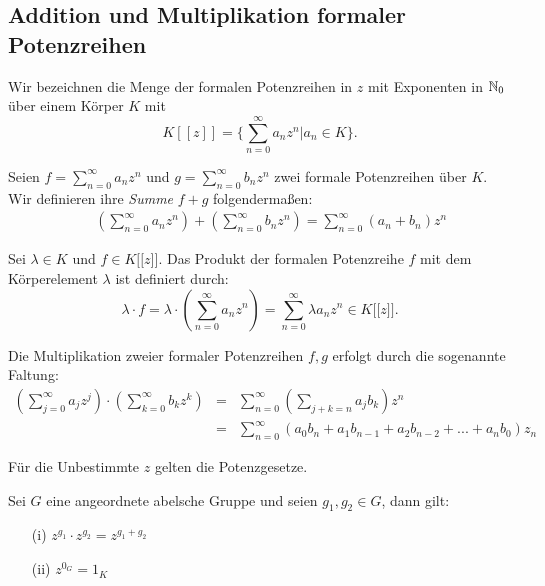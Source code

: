 \subsection{Addition und Multiplikation formaler Potenzreihen} \label{Rechnen}
Wir bezeichnen die Menge der formalen Potenzreihen in $z$ mit Exponenten in $\mathbb{N}_0$ über einem Körper $K$ mit \[K [[z]] = \lbrace \sum_{n=0}^\infty a_n z^n \vert a_n\in K \rbrace. \]
%
%
%
%
\begin{defn}\label{AdditionPotenzreihen}
%
Seien $f = \sum_{n=0}^\infty a_n z^n$ und $g = \sum_{n=0}^\infty b_n z^n$ zwei formale Potenzreihen über $K$. Wir definieren ihre \textit{Summe} $f+g$ folgendermaßen:
\begin{eqnarray*}
&&\left( \sum_{n=0}^\infty a_n z^n \right) + \left( \sum_{n=0}^\infty b_n z^n \right) = \sum_{n=0}^{\infty} (a_n + b_n) z^n 
\end{eqnarray*}
\end{defn}
%
%
% 
\begin{defn}\label{MultiplikationKPotenzreihen}
Sei $\lambda \in K$ und $f \in K\lbrack\lbrack z \rbrack\rbrack$. Das Produkt der formalen Potenzreihe $f$ mit dem Körperelement $\lambda$ ist definiert durch:
\[\lambda\cdot f = \lambda\cdot \left(\sum_{n=0}^{\infty}a_nz^n\right) = \sum_{n=0}^{\infty} \lambda a_nz^n \in K\lbrack\lbrack z\rbrack\rbrack. 
\]
\end{defn}
%
%
\begin{defn}\label{MultiplikationPotenzreihen}
Die Multiplikation zweier formaler Potenzreihen $f,g$ erfolgt durch die sogenannte Faltung:
\begin{eqnarray*}
\left( \sum_{j=0}^\infty a_j z^j \right)\cdot \left( \sum_{k=0}^\infty b_k z^k \right) &=&\sum_{n=0}^\infty \left(\sum_{j+k=n} a_j b_k\right) z^n \\
&=& \sum_{n= 0}^\infty \left(a_0b_n + a_1b_{n-1} + a_2b_{n-2} + ... + a_nb_0 \right)z_n
\end{eqnarray*}
\end{defn}
%
Für die Unbestimmte $z$ gelten die Potenzgesetze.
\begin{bem}[Potenzgesetze]\label{Potenzgesetze}
Sei $G$ eine angeordnete abelsche Gruppe und seien $g_1, g_2 \in G$, dann gilt:
\begin{itemize}
\item[(i)] $z^{g_1} \cdot z^{g_2} = z^{g_1 + g_2}$
\item[(ii)] $z^{0_G} = 1_K$
\end{itemize}
\end{bem}

